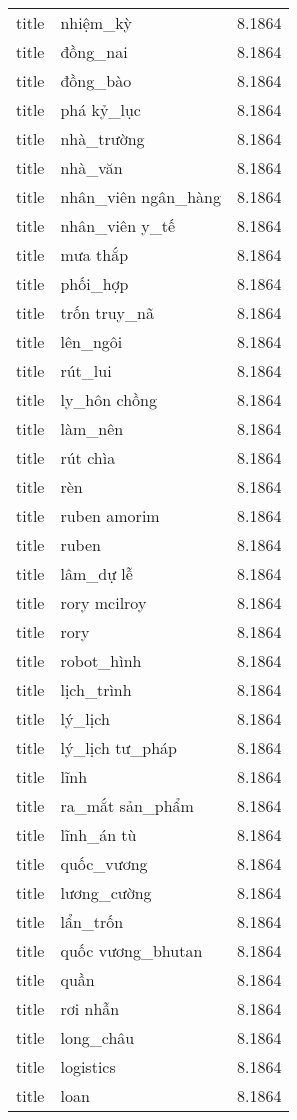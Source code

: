 \documentclass{article}
\begin{document}
\begin{tabular}{lll}
title & nhiệm\_kỳ & 8.1864\\
title & đồng\_nai & 8.1864\\
title & đồng\_bào & 8.1864\\
title & phá kỷ\_lục & 8.1864\\
title & nhà\_trường & 8.1864\\
title & nhà\_văn & 8.1864\\
title & nhân\_viên ngân\_hàng & 8.1864\\
title & nhân\_viên y\_tế & 8.1864\\
title & mưa thắp & 8.1864\\
title & phối\_hợp & 8.1864\\
title & trốn truy\_nã & 8.1864\\
title & lên\_ngôi & 8.1864\\
title & rút\_lui & 8.1864\\
title & ly\_hôn chồng & 8.1864\\
title & làm\_nên & 8.1864\\
title & rút chìa & 8.1864\\
title & rèn & 8.1864\\
title & ruben amorim & 8.1864\\
title & ruben & 8.1864\\
title & lâm\_dự lễ & 8.1864\\
title & rory mcilroy & 8.1864\\
title & rory & 8.1864\\
title & robot\_hình & 8.1864\\
title & lịch\_trình & 8.1864\\
title & lý\_lịch & 8.1864\\
title & lý\_lịch tư\_pháp & 8.1864\\
title & lĩnh & 8.1864\\
title & ra\_mắt sản\_phẩm & 8.1864\\
title & lĩnh\_án tù & 8.1864\\
title & quốc\_vương & 8.1864\\
title & lương\_cường & 8.1864\\
title & lẩn\_trốn & 8.1864\\
title & quốc vương\_bhutan & 8.1864\\
title & quần & 8.1864\\
title & rơi nhẫn & 8.1864\\
title & long\_châu & 8.1864\\
title & logistics & 8.1864\\
title & loan & 8.1864\\

\end{tabular}
\end{document}
